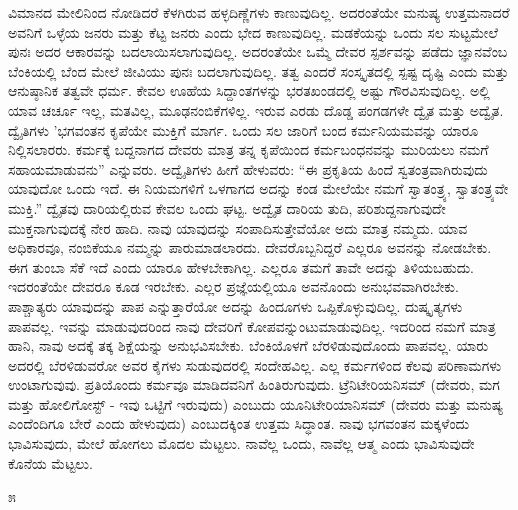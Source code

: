 ವಿಮಾನದ ಮೇಲಿನಿಂದ ನೋಡಿದರೆ ಕೆಳಗಿರುವ ಹಳ್ಳದಿಣ್ಣೆಗಳು ಕಾಣುವುದಿಲ್ಲ. ಅದರಂತೆಯೇ ಮನುಷ್ಯ ಉತ್ತಮನಾದರೆ ಅವನಿಗೆ ಒಳ್ಳೆಯ ಜನರು ಮತ್ತು ಕೆಟ್ಟ ಜನರು ಎಂದು ಭೇದ ಕಾಣುವುದಿಲ್ಲ. ಮಡಕೆಯನ್ನು ಒಂದು ಸಲ ಸುಟ್ಟಮೇಲೆ ಪುನಃ ಅದರ ಆಕಾರವನ್ನು ಬದಲಾಯಿಸಲಾಗುವುದಿಲ್ಲ. ಅದರಂತೆಯೇ ಒಮ್ಮೆ ದೇವರ ಸ್ಪರ್ಶವನ್ನು ಪಡೆದು ಜ್ಞಾನವೆಂಬ ಬೆಂಕಿಯಲ್ಲಿ ಬೆಂದ ಮೇಲೆ ಜೀವಿಯು ಪುನಃ ಬದಲಾಗುವುದಿಲ್ಲ. ತತ್ವ ಎಂದರೆ ಸಂಸ್ಕೃತದಲ್ಲಿ ಸ್ಪಷ್ಟ ದೃಷ್ಟಿ ಎಂದು ಮತ್ತು ಆನುಷ್ಠಾನಿಕ ತತ್ವವೇ ಧರ್ಮ. ಕೇವಲ ಊಹೆಯ ಸಿದ್ದಾಂತಗಳನ್ನು ಭರತಖಂಡದಲ್ಲಿ ಅಷ್ಟು ಗೌರವಿಸುವುದಿಲ್ಲ. ಅಲ್ಲಿ ಯಾವ ಚರ್ಚೂ ಇಲ್ಲ, ಮತವಿಲ್ಲ, ಮೂಢನಂಬಿಕೆಗಳಿಲ್ಲ. ಇರುವ ಎರಡು ದೊಡ್ಡ ಪಂಗಡಗಳೇ ದ್ವೈತ ಮತ್ತು ಅದ್ವೈತ. ದ್ವೈತಿಗಳು 'ಭಗವಂತನ ಕೃಪೆಯೇ ಮುಕ್ತಿಗೆ ಮಾರ್ಗ. ಒಂದು ಸಲ ಜಾರಿಗೆ ಬಂದ ಕರ್ಮನಿಯಮವನ್ನು ಯಾರೂ ನಿಲ್ಲಿಸಲಾರರು. ಕರ್ಮಕ್ಕೆ ಬದ್ದನಾಗದ ದೇವರು ಮಾತ್ರ ತನ್ನ ಕೃಪೆಯಿಂದ ಕರ್ಮಬಂಧನವನ್ನು ಮುರಿಯಲು ನಮಗೆ ಸಹಾಯಮಾಡುವನು” ಎನ್ನುವರು. ಅದ್ವೈತಿಗಳು ಹೀಗೆ ಹೇಳುವರು: “ಈ ಪ್ರಕೃತಿಯ ಹಿಂದೆ ಸ್ವತಂತ್ರವಾಗಿರುವುದು ಯಾವುದೋ ಒಂದು ಇದೆ. ಈ ನಿಯಮಗಳಿಗೆ ಒಳಗಾಗದ ಅದನ್ನು ಕಂಡ ಮೇಲೆಯೇ ನಮಗೆ ಸ್ವಾತಂತ್ರ್ಯ, ಸ್ವಾತಂತ್ರ್ಯವೇ ಮುಕ್ತಿ.” ದ್ವೈತವು ದಾರಿಯಲ್ಲಿರುವ ಕೇವಲ ಒಂದು ಘಟ್ಟ. ಅದ್ವೈತ ದಾರಿಯ ತುದಿ, ಪರಿಶುದ್ದನಾಗುವುದೇ ಮುಕ್ತನಾಗುವುದಕ್ಕೆ ನೇರ ಹಾದಿ. ನಾವು ಯಾವುದನ್ನು ಸಂಪಾದಿಸುತ್ತೇವೆಯೋ ಅದು ಮಾತ್ರ ನಮ್ಮದು. ಯಾವ ಅಧಿಕಾರವೂ, ನಂಬಿಕೆಯೂ ನಮ್ಮನ್ನು ಪಾರುಮಾಡಲಾರದು. ದೇವರೊಬ್ಬನಿದ್ದರೆ ಎಲ್ಲರೂ ಅವನನ್ನು ನೋಡಬೇಕು. ಈಗ ತುಂಬಾ ಸೆಕೆ ಇದೆ ಎಂದು ಯಾರೂ ಹೇಳಬೇಕಾಗಿಲ್ಲ. ಎಲ್ಲರೂ ತಮಗೆ ತಾವೇ ಅದನ್ನು ತಿಳಿಯಬಹುದು. ಇದರಂತೆಯೇ ದೇವರೂ ಕೂಡ ಇರಬೇಕು. ಎಲ್ಲರ ಪ್ರಜ್ಞೆಯಲ್ಲಿಯೂ ಅವನೊಂದು ಅನುಭವವಾಗಿರಬೇಕು. ಪಾಶ್ಚಾತ್ಯರು ಯಾವುದನ್ನು ಪಾಪ ಎನ್ನುತ್ತಾರೆಯೋ ಅದನ್ನು ಹಿಂದೂಗಳು ಒಪ್ಪಿಕೊಳ್ಳುವುದಿಲ್ಲ. ದುಷ್ಕೃತ್ಯಗಳು ಪಾಪವಲ್ಲ. ಇವನ್ನು ಮಾಡುವುದರಿಂದ ನಾವು ದೇವರಿಗೆ ಕೋಪವನ್ನುಂಟುಮಾಡುವುದಿಲ್ಲ. ಇದರಿಂದ ನಮಗೆ ಮಾತ್ರ ಹಾನಿ, ನಾವು ಅದಕ್ಕೆ ತಕ್ಕ ಶಿಕ್ಷೆಯನ್ನು ಅನುಭವಿಸಬೇಕು. ಬೆಂಕಿಯೊಳಗೆ ಬೆರಳಿಡುವುದೊಂದು ಪಾಪವಲ್ಲ. ಯಾರು ಅದರಲ್ಲಿ ಬೆರಳಿಡುವರೋ ಅವರ ಕೈಗಳು ಸುಡುವುದರಲ್ಲಿ ಸಂದೇಹವಿಲ್ಲ. ಎಲ್ಲ ಕರ್ಮಗಳಿಂದ ಕೆಲವು ಪರಿಣಾಮಗಳು ಉಂಟಾಗುವುವು. ಪ್ರತಿಯೊಂದು ಕರ್ಮವೂ ಮಾಡಿದವನಿಗೆ ಹಿಂತಿರುಗುವುದು. ಟ್ರೆನಿಟೇರಿಯನಿಸಮ್ (ದೇವರು, ಮಗ ಮತ್ತು ಹೋಲಿಗೋಸ್ಟ್ - ಇವು ಒಟ್ಟಿಗೆ ಇರುವುದು) ಎಂಬುದು ಯೂನಿಟೇರಿಯಾನಿಸಮ್ (ದೇವರು ಮತ್ತು ಮನುಷ್ಯ ಎಂದೆಂದಿಗೂ ಬೇರೆ ಎಂದು ಹೇಳುವುದು) ಎಂಬುದಕ್ಕಿಂತ ಉತ್ತಮ ಸಿದ್ಧಾಂತ. ನಾವು ಭಗವಂತನ ಮಕ್ಕಳೆಂದು ಭಾವಿಸುವುದು, ಮೇಲೆ ಹೋಗಲು ಮೊದಲ ಮೆಟ್ಟಲು. ನಾವೆಲ್ಲ ಒಂದು, ನಾವೆಲ್ಲ ಆತ್ಮ ಎಂದು ಭಾವಿಸುವುದೇ ಕೊನೆಯ ಮೆಟ್ಟಲು.

\begin{center}
೫
\end{center}

